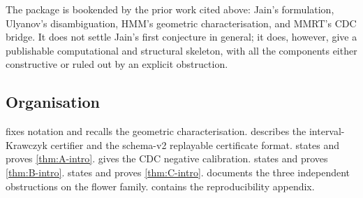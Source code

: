 The package is bookended by the prior work cited above: Jain's
formulation, Ulyanov's disambiguation, HMM's geometric characterisation,
and MMRT's CDC bridge. It does not settle Jain's first conjecture in
general; it does, however, give a publishable computational and
structural skeleton, with all the components either constructive or
ruled out by an explicit obstruction.

\subsection{Organisation}
\label{sec:intro-organisation}

 fixes notation and recalls the geometric
characterisation.  describes the
interval-Krawczyk certifier and the schema-v2 replayable certificate
format.  states and proves
\cref{thm:A-intro}.  gives the CDC negative
calibration.  states and proves
\cref{thm:B-intro}.  states and
proves \cref{thm:C-intro}.  documents the
three independent obstructions on the flower family.
 contains the reproducibility appendix.
